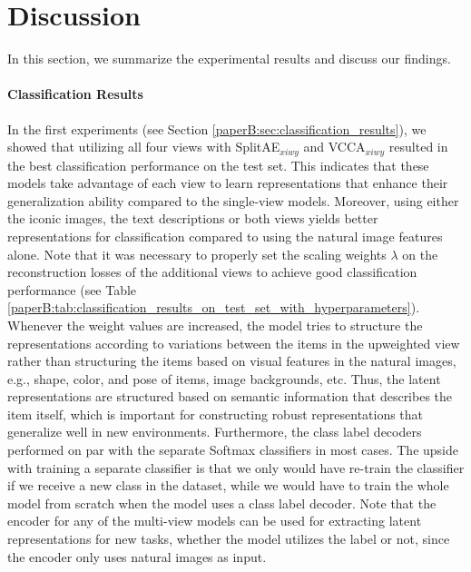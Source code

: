 \section{Discussion}\label{paperB:sec:discussion}

In this section, we summarize the experimental results and discuss our findings.

\vspace{-3mm}
\paragraph{Classification Results} In the first experiments (see Section \ref{paperB:sec:classification_results}), %
we showed that utilizing all four views with SplitAE$_{x i w y}$ and VCCA$_{x i w y}$ resulted in the best classification performance on the test set. This indicates that these models take advantage of each view to learn representations that enhance their generalization ability compared to the single-view models. Moreover, using either the iconic images, the text descriptions or both views yields better representations for classification compared to using the natural image features alone. Note that it was necessary to properly set the scaling weights $\lambda$ on the reconstruction losses of the additional views to achieve good classification performance (see Table \ref{paperB:tab:classification_results_on_test_set_with_hyperparameters}). %
Whenever the weight values are increased, the model tries to structure the representations according to variations between the items in the upweighted view rather than structuring the items based on visual features in the natural images, e.g., shape, color, and pose of items, image backgrounds, etc. 
Thus, the latent representations are structured based on semantic information that describes the item itself, which is important for constructing robust representations that generalize well in new environments. Furthermore, the class label decoders performed on par with the separate Softmax classifiers in most cases. The upside with training a separate classifier is that we only would have re-train the classifier if we receive a new class in the dataset, while we would have to train the whole model from scratch when the model uses a class label decoder. Note that the encoder for any of the multi-view models can be used for extracting latent representations for new tasks, whether the model utilizes the label or not, since the encoder only uses natural images as input. 

